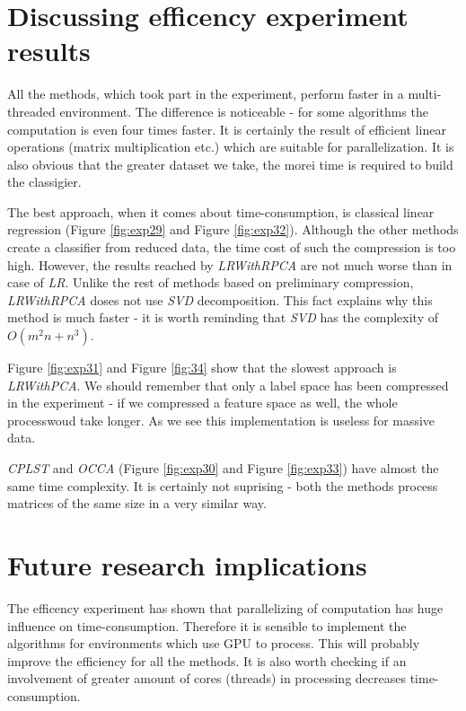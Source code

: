 \section{Discussing efficency experiment results}

All the methods, which took part in the experiment, perform faster in a multi-threaded environment. The difference is noticeable - for some algorithms the computation is even four times faster. It is certainly the result of efficient linear operations (matrix multiplication etc.) which are suitable for parallelization. It is also obvious that the greater dataset we take, the morei time is required to build the classigier.

The best approach, when it comes about time-consumption, is classical linear regression (Figure \ref{fig:exp29} and Figure \ref{fig:exp32}). Although the other methods create a classifier from reduced data, the time cost of such the compression is too high. However, the results reached by \textit{LRWithRPCA} are not much worse than in case of \textit{LR}. Unlike the rest of methods based on preliminary compression, \textit{LRWithRPCA} doses not use \textit{SVD} decomposition. This fact explains why this method is much faster - it is worth reminding that \textit{SVD} has the complexity of $O(m^2n+n^3)$. 

Figure \ref{fig:exp31} and Figure \ref{fig:34} show that the slowest approach is \textit{LRWithPCA}. We should remember that only a label space has been compressed in the experiment - if we compressed a feature space as well, the whole processwoud take longer. As we see this implementation is useless for massive data. 

\textit{CPLST} and \textit{OCCA} (Figure \ref{fig:exp30} and Figure \ref{fig:exp33}) have almost the same time complexity. It is certainly not suprising - both the methods process matrices of the same size in a very similar way.

\section{Future research implications}

The efficency experiment has shown that parallelizing of computation has huge influence on time-consumption. Therefore it is sensible to implement the algorithms for environments which use GPU to process. This will probably improve the efficiency for all the methods. It is also worth checking if an involvement of greater amount of cores (threads) in processing decreases time-consumption.  

